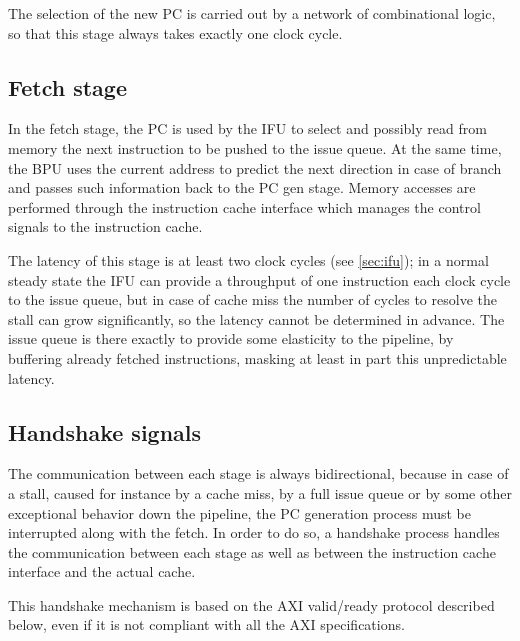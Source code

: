 The selection of the new \ac{PC} is carried out by a network of combinational logic, so that this stage always takes exactly one clock cycle.

\subsection{Fetch stage}
In the fetch stage, the \ac{PC} is used by the \acf{IFU} to select and possibly read from memory the next instruction to be pushed to the issue queue. At the same time, the \acf{BPU} uses the current address to predict the next direction in case of branch and passes such information back to the \ac{PC} gen stage. Memory accesses are performed through the instruction cache interface which manages the control signals to the instruction cache. 

The latency of this stage is at least two clock cycles (see \cref{sec:ifu}); in a normal steady state the \ac{IFU} can provide a throughput of one instruction each clock cycle to the issue queue, but in case of cache miss the number of cycles to resolve the stall can grow significantly, so the latency cannot be determined in advance. The issue queue is there exactly to provide some elasticity to the pipeline, by buffering already fetched instructions, masking at least in part this unpredictable latency.

\subsection{Handshake signals}\label{sec:handshake}
The communication between each stage is always bidirectional, because in case of a stall, caused for instance by a cache miss, by a full issue queue or by some other exceptional behavior down the pipeline, the \ac{PC} generation process must be interrupted along with the fetch. In order to do so, a handshake process handles the communication between each stage as well as between the instruction cache interface and the actual cache.

This handshake mechanism is based on the AXI valid/ready protocol described below, even if it is not compliant with all the AXI specifications.

